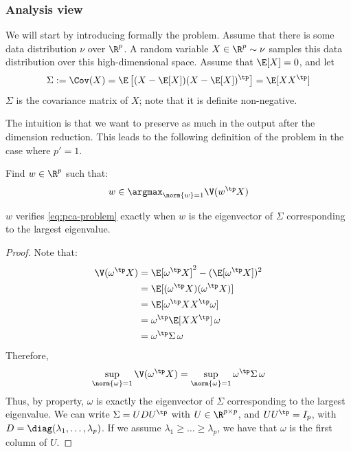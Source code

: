 \documentclass[toc, titlepaged]{../cs-classes/cs-classes}
\begin{document}
\subsubsection{Analysis view}
We will start by introducing formally the problem. Assume that there is some data distribution $\nu$ over $\R^p$. A random variable $X\in\R^p\sim\nu$ samples this data distribution over this high-dimensional space. Assume that $\E[X]=0$, and let
\begin{equation*}
    \Sigma:=\Cov(X)=\E\left[(X-\E[X])(X-\E[X])^\tp\right]=\E[XX^\tp]
\end{equation*}
$\Sigma$ is the covariance matrix of $X$; note that it is definite non-negative.

The intuition is that we want to preserve as much  in the output after the dimension reduction. This leads to the following definition of the problem in the case where $p'=1$.
\begin{definition}
    Find $w\in\R^{p}$ such that:
    \begin{equation}
        \label{eq:pca-problem}
        w\in\argmax_{\norm{w}=1}\V(w^\tp X)
    \end{equation}
\end{definition}

\begin{theorem}
    $w$ verifies \eqref{eq:pca-problem} exactly when $w$ is the eigenvector of $\Sigma$ corresponding to the largest eigenvalue.
\end{theorem}
\begin{proof}
    Note that:
    \begin{equation*}
        \begin{aligned}
            \V(\omega^\tp X)&=\E[\omega^\tp X]^2-(\E[\omega^\tp X])^2\\
            &= \E[(\omega^\tp X)(\omega^\tp X)] \\
            &= \E[\omega^\tp XX^\tp\omega]\\
            &=\omega^\tp\E[XX^\tp]\,\omega \\
            &= \omega^\tp\Sigma\,\omega
        \end{aligned}
    \end{equation*}
    Therefore,
    \begin{equation*}
        \sup_{\norm{\omega}=1}\V(\omega^\tp X) = \sup_{\norm{\omega}=1}\omega^\tp\Sigma\,\omega
    \end{equation*}
    Thus, by property, $\omega$ is exactly the eigenvector of $\Sigma$ corresponding to the largest eigenvalue. We can write $\Sigma=UDU^\tp$ with $U\in\R^{p\times p}$, and $UU^\tp=I_p$, with $D=\diag(\lambda_1, \dots, \lambda_p)$. If we assume $\lambda_1\geq\dots\geq\lambda_p$, we have that $\omega$ is the first column of $U$. %
\end{proof}
\end{document}

